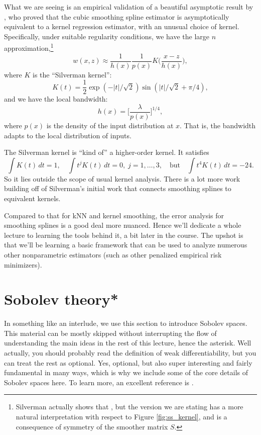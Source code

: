 \documentclass{article}
\begin{document}
What we are seeing is an empirical validation of a beautiful asymptotic result
by \citet{silverman1984spline}, who proved that the cubic smoothing spline
estimator is asymptotically equivalent to a kernel regression estimator, with an 
unusual choice of kernel. Specifically, under suitable regularity conditions, we
have the large $n$ approximation,\footnote{Silverman actually shows that
  ,
  but the version we are stating has a more natural interpretation with respect
  to Figure \ref{fig:ss_kernel}, and is a consequence of symmetry of the
  smoother matrix $S$.}  
\[
w(x, z) \approx \frac{1}{h(x)} \frac{1}{p(x)} K\bigg( \frac{x-z}{h(x)} \bigg), 
\]
where $K$ is the ``Silverman kernel'': 
\[
K(t) = \frac{1}{2} \exp(-|t|/\sqrt{2}) \sin(|t|/\sqrt{2} + \pi/4), 
\]
and we have the local bandwidth: 
\[
h(x) = \bigg[ \frac{\lambda}{p(x)} \bigg]^{1/4},
\]
where $p(x)$ is the density of the input distribution at $x$. That is, the
bandwidth adapts to the local distribution of inputs. 

The Silverman kernel is ``kind of'' a higher-order kernel. It satisfies 
\[
\int K(t) \, dt = 1, \quad
\int t^j K(t) \, dt = 0, \; j=1,\dots,3, 
\quad \text{but} \quad 
\int t^4 K(t) \, dt = -24.
\]
So it lies outside the scope of usual kernel analysis. There is a lot more work
building off of Silverman's initial work that connects smoothing splines to
equivalent kernels. 

Compared to that for kNN and kernel smoothing, the error analysis for smoothing
splines is a good deal more nuanced. Hence we'll dedicate a whole lecture to
learning the tools behind it, a bit later in the course. The upshot is that
we'll be learning a basic framework that can be used to analyze numerous other
nonparametric estimators (such as other penalized empirical risk minimizers).     

\section{Sobolev theory*}

In something like an interlude, we use this section to introduce Sobolev
spaces. This material can be mostly skipped without interrupting the flow of
understanding the main ideas in the rest of this lecture, hence the
asterisk. Well actually, you should probably read the definition of weak
differentiability, but you can treat the rest as optional. Yes, optional, but
also super interesting and fairly fundamental in many ways, which is why we
include some of the core details of Sobolev spaces here. To learn more, an
excellent reference is \citet{evans2010partial}.  
\end{document}

